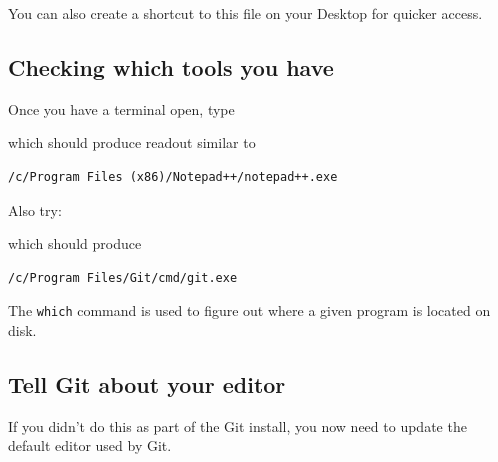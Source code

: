 You can also create a shortcut to this file on your Desktop for quicker
access.

\subsection{Checking which tools you
have}\label{checking-which-tools-you-have}

Once you have a terminal open, type

\begin{Shaded}
\begin{Highlighting}[]
 
\end{Highlighting}
\end{Shaded}

which should produce readout similar to

\begin{verbatim}
/c/Program Files (x86)/Notepad++/notepad++.exe
\end{verbatim}

Also try:

\begin{Shaded}
\begin{Highlighting}[]
 
\end{Highlighting}
\end{Shaded}

which should produce

\begin{verbatim}
/c/Program Files/Git/cmd/git.exe
\end{verbatim}

The \texttt{which} command is used to figure out where a given program
is located on disk.

\subsection{Tell Git about your
editor}\label{tell-git-about-your-editor}

If you didn't do this as part of the Git install, you now need to update
the default editor used by Git.

\begin{Shaded}
\begin{Highlighting}[]
 
\end{Highlighting}
\end{Shaded}

